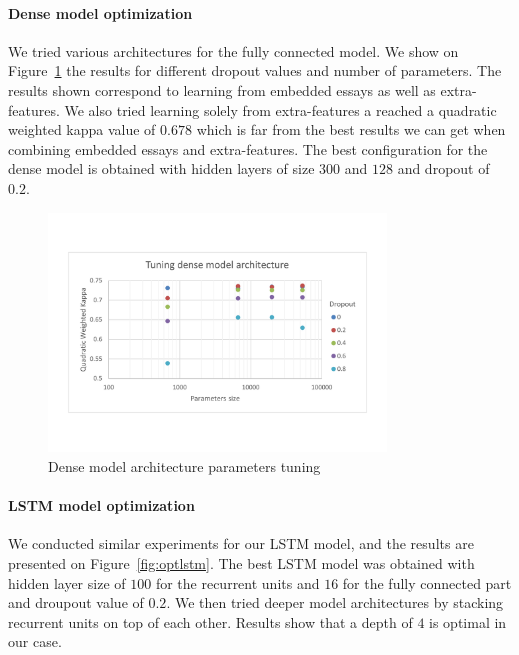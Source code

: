\documentclass[a4paper,12pt,english]{article}
\begin{document}
\paragraph{Dense model optimization} We tried various architectures for the fully connected model. We show on Figure~\ref{fig:optdense} the results for different dropout values and number of parameters. The results shown correspond to learning from embedded essays as well as extra-features. We also tried learning solely from extra-features a reached a quadratic weighted kappa value of $0.678$ which is far from the best results we can get when combining embedded essays and extra-features. The best configuration for the dense model is obtained with hidden layers of size $300$ and $128$ and dropout of $0.2$.

\begin{figure}[h]
\vspace*{-1.5cm}	
	\centering
	\includegraphics[width=0.8\textwidth]{fig/tune_dense_arch.pdf}
	\caption{Dense model architecture parameters tuning}
	\label{fig:optdense}
\end{figure}

\paragraph{LSTM model optimization} We conducted similar experiments for our LSTM model, and the results are presented on Figure~\ref{fig:optlstm}. The best LSTM model was obtained with hidden layer size of $100$ for the recurrent units and $16$ for the fully connected part and droupout value of $0.2$. We then tried deeper model architectures by stacking recurrent units on top of each other. Results show that a depth of $4$ is optimal in our case.
\end{document}
